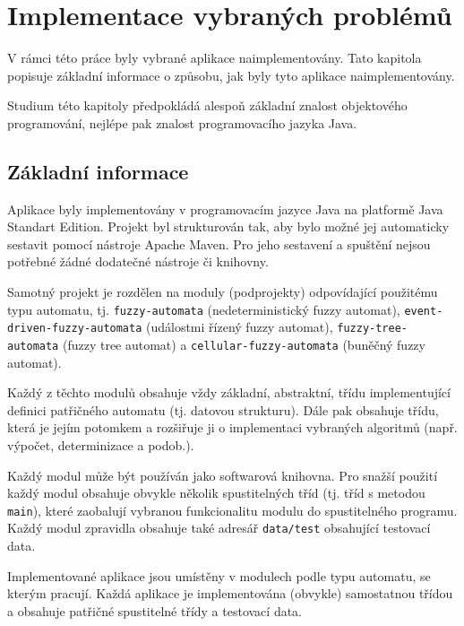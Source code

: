 \documentclass[a4paper,10pt]{article}
\begin{document}
\section{Implementace vybraných problémů}
V rámci této práce byly vybrané aplikace naimplementovány. Tato kapitola popisuje základní informace o způsobu, jak byly tyto aplikace naimplementovány.

Studium této kapitoly předpokládá alespoň základní znalost objektového programování, nejlépe pak znalost programovacího jazyka Java.

\subsection{Základní informace}
Aplikace byly implementovány v programovacím jazyce Java na platformě Java Standart Edition. Projekt byl strukturován tak, aby bylo možné jej automaticky sestavit pomocí nástroje Apache Maven. Pro jeho sestavení a spuštění nejsou potřebné žádné dodatečné nástroje či knihovny.

Samotný projekt je rozdělen na moduly (podprojekty) odpovídající použitému typu automatu, tj. \verb|fuzzy-automata| (nedeterministický fuzzy automat), \verb|event-driven-fuzzy-automata| (událostmi řízený fuzzy automat), \verb|fuzzy-tree-automata| (fuzzy tree automat) a \verb|cellular-fuzzy-automata| (buněčný fuzzy automat).

Každý z těchto modulů obsahuje vždy základní, abstraktní, třídu implementující definici patřičného automatu (tj. datovou strukturu). Dále pak obsahuje třídu, která je jejím potomkem a rozšiřuje ji o implementaci vybraných algoritmů (např. výpočet, determinizace a podob.).

Každý modul může být používán jako softwarová knihovna. Pro snažší použití každý modul obsahuje obvykle několik spustitelných tříd (tj. tříd s metodou \verb|main|), které zaobalují vybranou funkcionalitu modulu do spustitelného programu. Každý modul zpravidla obsahuje také adresář \verb|data/test| obsahující testovací data.

Implementované aplikace jsou umístěny v modulech podle typu automatu, se kterým pracují. Každá aplikace je implementována (obvykle) samostatnou třídou a obsahuje patřičné spustitelné třídy a testovací data.
\end{document}
